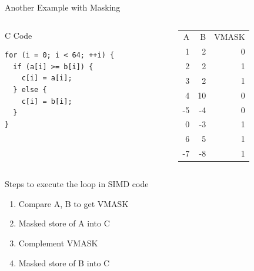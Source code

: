 \documentclass[presentation]{beamer}
\begin{document}
\begin{frame}[label={sec:org5b8f9fc},fragile]{Another Example with Masking}
 \begin{columns}
\begin{column}{.35\columnwidth}
\begin{block}{C Code}
\lstset{language=C,label= ,caption= ,captionpos=b,numbers=none}
\begin{lstlisting}
for (i = 0; i < 64; ++i) {
  if (a[i] >= b[i]) {
    c[i] = a[i];
  } else {
    c[i] = b[i];
  }
}
\end{lstlisting}
\pause
\end{block}
\end{column}
\begin{column}{.60\columnwidth}
\begin{block}{}
\small
\begin{center}
\begin{tabular}{rrr}
A & B & VMASK\\
1 & 2 & 0\\
2 & 2 & 1\\
3 & 2 & 1\\
4 & 10 & 0\\
-5 & -4 & 0\\
0 & -3 & 1\\
6 & 5 & 1\\
-7 & -8 & 1\\
\end{tabular}
\end{center}
\end{block}
\end{column}
\end{columns}

\begin{block}{}
\end{block}

\begin{columns}
\begin{column}{1\columnwidth}
\begin{block}{Steps to execute the loop in SIMD code}
\begin{enumerate}
\item \alert{Compare A, B to get VMASK}
\item Masked store of A into C
\item Complement VMASK
\item Masked store of B into C
\end{enumerate}
\end{block}
\end{column}
\end{columns}
\end{frame}
\end{document}
